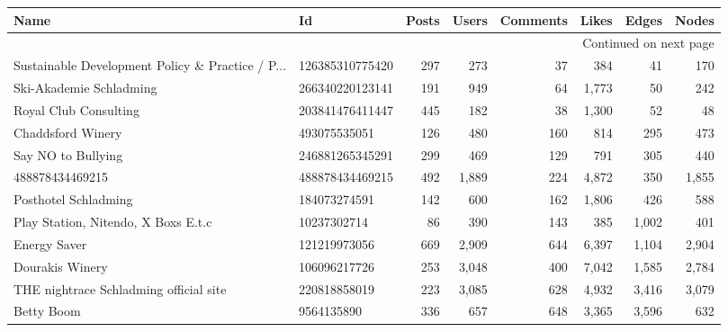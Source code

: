 \begin{longtable}{llrrrrrr}
\toprule
                                              Name &               Id &   Posts &       Users &   Comments &       Likes &         Edges &      Nodes \\
\midrule
\endhead
\midrule
\multicolumn{8}{r}{{Continued on next page}} \\
\midrule
\endfoot

\bottomrule
\endlastfoot
 Sustainable Development Policy \& Practice / P... &  126385310775420 &     297 &         273 &         37 &         384 &            41 &        170 \\
                           Ski-Akademie Schladming &  266340220123141 &     191 &         949 &         64 &       1,773 &            50 &        242 \\
                             Royal Club Consulting &  203841476411447 &     445 &         182 &         38 &       1,300 &            52 &         48 \\
                                 Chaddsford Winery &     493075535051 &     126 &         480 &        160 &         814 &           295 &        473 \\
                                Say NO to Bullying &  246881265345291 &     299 &         469 &        129 &         791 &           305 &        440 \\
                                   488878434469215 &  488878434469215 &     492 &       1,889 &        224 &       4,872 &           350 &      1,855 \\
                              Posthotel Schladming &     184073274591 &     142 &         600 &        162 &       1,806 &           426 &        588 \\
              Play Station, Nitendo, X Boxs  E.t.c &      10237302714 &      86 &         390 &        143 &         385 &         1,002 &        401 \\
                                      Energy Saver &     121219973056 &     669 &       2,909 &        644 &       6,397 &         1,104 &      2,904 \\
                                   Dourakis Winery &     106096217726 &     253 &       3,048 &        400 &       7,042 &         1,585 &      2,784 \\
            THE nightrace Schladming official site &     220818858019 &     223 &       3,085 &        628 &       4,932 &         3,416 &      3,079 \\
                                        Betty Boom &       9564135890 &     336 &         657 &        648 &       3,365 &         3,596 &        632 \\

\end{longtable}
